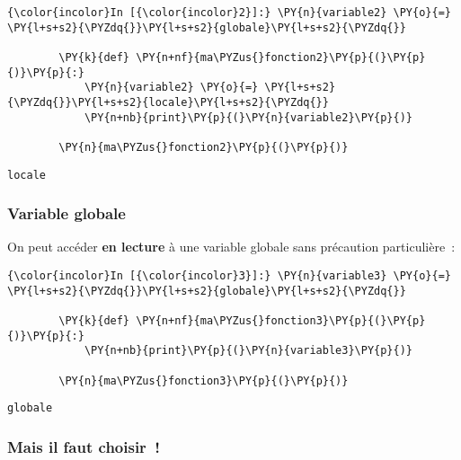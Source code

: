    \begin{Verbatim}[commandchars=\\\{\}]
{\color{incolor}In [{\color{incolor}2}]:} \PY{n}{variable2} \PY{o}{=} \PY{l+s+s2}{\PYZdq{}}\PY{l+s+s2}{globale}\PY{l+s+s2}{\PYZdq{}}
        
        \PY{k}{def} \PY{n+nf}{ma\PYZus{}fonction2}\PY{p}{(}\PY{p}{)}\PY{p}{:}
            \PY{n}{variable2} \PY{o}{=} \PY{l+s+s2}{\PYZdq{}}\PY{l+s+s2}{locale}\PY{l+s+s2}{\PYZdq{}}
            \PY{n+nb}{print}\PY{p}{(}\PY{n}{variable2}\PY{p}{)}
        
        \PY{n}{ma\PYZus{}fonction2}\PY{p}{(}\PY{p}{)}
\end{Verbatim}


    \begin{Verbatim}[commandchars=\\\{\}]
locale

    \end{Verbatim}

    \hypertarget{variable-globale}{%
\subsubsection{Variable globale}\label{variable-globale}}

    On peut accéder \textbf{en lecture} à une variable globale sans
précaution particulière~:

    \begin{Verbatim}[commandchars=\\\{\}]
{\color{incolor}In [{\color{incolor}3}]:} \PY{n}{variable3} \PY{o}{=} \PY{l+s+s2}{\PYZdq{}}\PY{l+s+s2}{globale}\PY{l+s+s2}{\PYZdq{}}
        
        \PY{k}{def} \PY{n+nf}{ma\PYZus{}fonction3}\PY{p}{(}\PY{p}{)}\PY{p}{:}
            \PY{n+nb}{print}\PY{p}{(}\PY{n}{variable3}\PY{p}{)}
        
        \PY{n}{ma\PYZus{}fonction3}\PY{p}{(}\PY{p}{)}
\end{Verbatim}


    \begin{Verbatim}[commandchars=\\\{\}]
globale

    \end{Verbatim}

    \hypertarget{mais-il-faut-choisir}{%
\subsubsection{Mais il faut choisir~!}\label{mais-il-faut-choisir}}

